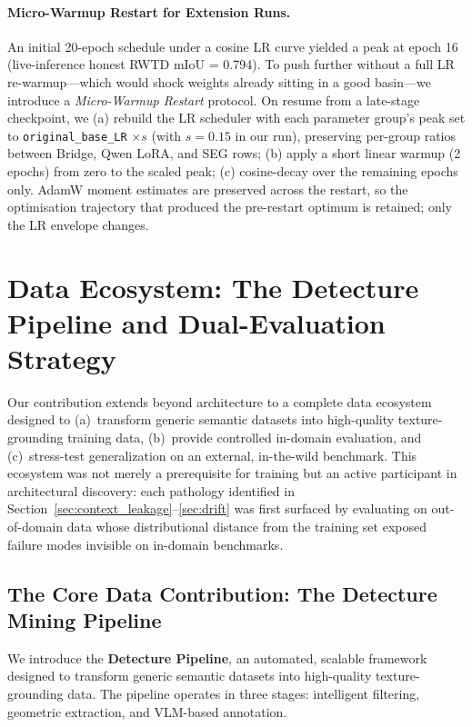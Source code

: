 \documentclass{article}
\begin{document}
\paragraph{Micro-Warmup Restart for Extension Runs.}
An initial 20-epoch schedule under a cosine LR curve yielded a peak at epoch 16 (live-inference honest RWTD mIoU = 0.794). To push further without a full LR re-warmup---which would shock weights already sitting in a good basin---we introduce a \emph{Micro-Warmup Restart} protocol. On resume from a late-stage checkpoint, we (a) rebuild the LR scheduler with each parameter group's peak set to \texttt{original\_base\_LR} $\times s$ (with $s = 0.15$ in our run), preserving per-group ratios between Bridge, Qwen LoRA, and SEG rows; (b) apply a short linear warmup (2 epochs) from zero to the scaled peak; (c) cosine-decay over the remaining epochs only. AdamW moment estimates are preserved across the restart, so the optimisation trajectory that produced the pre-restart optimum is retained; only the LR envelope changes.

\section{Data Ecosystem: The Detecture Pipeline and Dual-Evaluation Strategy}
\label{sec:data}

Our contribution extends beyond architecture to a complete data ecosystem designed to (a)~transform generic semantic datasets into high-quality texture-grounding training data, (b)~provide controlled in-domain evaluation, and (c)~stress-test generalization on an external, in-the-wild benchmark. This ecosystem was not merely a prerequisite for training but an active participant in architectural discovery: each pathology identified in Section~\ref{sec:context_leakage}--\ref{sec:drift} was first surfaced by evaluating on out-of-domain data whose distributional distance from the training set exposed failure modes invisible on in-domain benchmarks.

\subsection{The Core Data Contribution: The Detecture Mining Pipeline}
\label{sec:pipeline}

We introduce the \textbf{Detecture Pipeline}, an automated, scalable framework designed to transform generic semantic datasets into high-quality texture-grounding data. The pipeline operates in three stages: intelligent filtering, geometric extraction, and VLM-based annotation.
\end{document}
